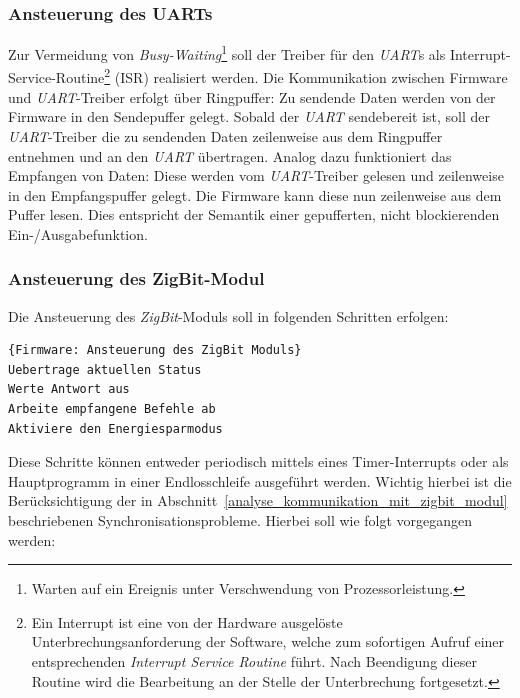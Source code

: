 \subsubsection{Ansteuerung des UARTs}
Zur Vermeidung von \emph{Busy-Waiting}\footnote{Warten auf ein Ereignis unter Verschwendung von Prozessorleistung.}
soll der Treiber für den \emph{UART}s als Interrupt-Service-Routine\footnote{Ein Interrupt ist eine von der Hardware
ausgelöste Unterbrechungsanforderung der Software, welche zum sofortigen Aufruf einer entsprechenden \emph{Interrupt Service Routine}
führt. Nach Beendigung dieser Routine wird die Bearbeitung an der Stelle der Unterbrechung fortgesetzt.} (ISR)
realisiert werden. Die Kommunikation zwischen Firmware und \emph{UART}-Treiber erfolgt über Ringpuffer:
Zu sendende Daten werden von der Firmware in den Sendepuffer gelegt. Sobald der \emph{UART} sendebereit ist, 
soll der \emph{UART}-Treiber die zu sendenden Daten zeilenweise aus dem Ringpuffer entnehmen und an
den \emph{UART} übertragen. Analog dazu funktioniert das Empfangen von Daten: Diese werden vom \emph{UART}-Treiber gelesen
und zeilenweise in den Empfangspuffer gelegt. Die Firmware kann diese nun zeilenweise aus dem Puffer lesen.
Dies entspricht der Semantik einer gepufferten, nicht blockierenden Ein-/Ausgabefunktion.

\subsubsection{Ansteuerung des ZigBit-Modul}
Die Ansteuerung des \emph{ZigBit}-Moduls soll in folgenden Schritten erfolgen: 

\begin{lstlisting}{Firmware: Ansteuerung des ZigBit Moduls}
Uebertrage aktuellen Status
Werte Antwort aus
Arbeite empfangene Befehle ab
Aktiviere den Energiesparmodus
\end{lstlisting}

Diese Schritte können entweder periodisch mittels eines Timer-Interrupts oder als Hauptprogramm in einer Endlosschleife
ausgeführt werden. Wichtig hierbei ist die Berücksichtigung der in Abschnitt~\ref{analyse_kommunikation_mit_zigbit_modul}
beschriebenen Synchronisationsprobleme. Hierbei soll wie folgt vorgegangen werden:

